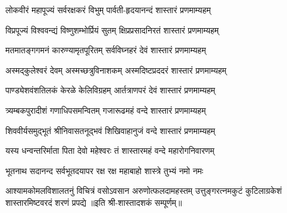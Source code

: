 
\twolineshloka
{लोकवीरं महापूज्यं सर्वरक्षकरं विभुम्}
{पार्वती-हृदयानन्दं शास्तारं प्रणमाम्यहम्}

\twolineshloka
{विप्रपूज्यं विश्ववन्द्यं विष्णुशम्भोर्प्रियं सुतम्}
{क्षिप्रप्रसादनिरतं शास्तारं प्रणमाम्यहम्}

\twolineshloka
{मतमातङ्गगमनं कारुण्यामृतपूरितम्}
{सर्वविघ्नहरं देवं शास्तारं प्रणमाम्यहम्}

\twolineshloka
{अस्मद्कुलेश्वरं देवम् अस्मच्छत्रुविनाशकम्}
{अस्मदिष्टप्रददरं शास्तारं प्रणमाम्यहम्}

\twolineshloka
{पाण्ड्येशवंशतिलकं केरळे केलिविग्रहम्}
{आर्तत्राणपरं देवं शास्तारं प्रणमाम्यहम्}

\twolineshloka
{त्र्यम्बकपुरादीशं गणाधिपसमन्वितम्}
{गजारूढमहं वन्दे शास्तारं प्रणमाम्यहम्}

\twolineshloka
{शिववीर्यसमुद्भूतं श्रीनिवासतनूद्भवं}
{शिखिवाहानुजं वन्दे शास्तारं प्रणमाम्यहम्}

\twolineshloka
{यस्य धन्वन्तरिर्माता पिता देवो महेश्वरः}
{तं शास्तारमहं वन्दे महारोगनिवारणम्}

\twolineshloka
{भूतनाथ सदानन्द सर्वभूतदयापर}
{रक्ष रक्ष महाबाहो शास्त्रे तुभ्यं नमो नमः}

\fourlineindentedshloka
{आश्यामकोमलविशालतनुं विचित्रं}
{वसोऽवसान अरुणोत्फलदामहस्तम्}
{उत्तुङ्गरत्नमकुटं कुटिलाग्रकेशं}
{शास्तारमिष्टवरदं शरणं प्रपद्ये}
॥इति श्री-शास्तादशकं सम्पूर्णम्॥